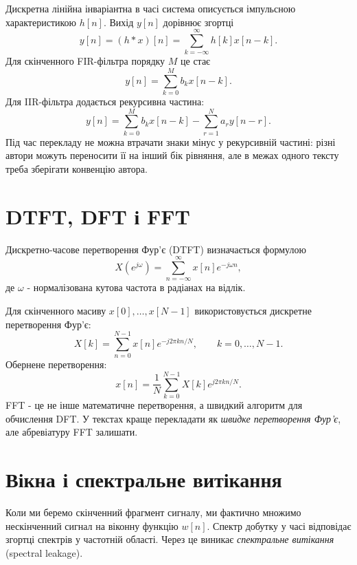 Дискретна лінійна інваріантна в часі система описується імпульсною характеристикою $h[n]$. Вихід $y[n]$ дорівнює згортці
\begin{equation}
    y[n] = (h*x)[n] = \sum_{k=-\infty}^{\infty} h[k]x[n-k].
\end{equation}
Для скінченного FIR-фільтра порядку $M$ це стає
\begin{equation}
    y[n] = \sum_{k=0}^{M} b_k x[n-k].
\end{equation}
Для IIR-фільтра додається рекурсивна частина:
\begin{equation}
    y[n] = \sum_{k=0}^{M} b_k x[n-k] - \sum_{r=1}^{N} a_r y[n-r].
\end{equation}
Під час перекладу не можна втрачати знаки мінус у рекурсивній частині: різні автори можуть переносити її на інший бік рівняння, але в межах одного тексту треба зберігати конвенцію автора.

\section{DTFT, DFT і FFT}

Дискретно-часове перетворення Фур'є (DTFT) визначається формулою
\begin{equation}
    X(e^{j\omega}) = \sum_{n=-\infty}^{\infty} x[n]e^{-j\omega n},
\end{equation}
де $\omega$ - нормалізована кутова частота в радіанах на відлік.

Для скінченного масиву $x[0],\dots,x[N-1]$ використовується дискретне перетворення Фур'є:
\begin{equation}
    X[k] = \sum_{n=0}^{N-1} x[n]e^{-j2\pi kn/N}, \qquad k=0,\dots,N-1.
\end{equation}
Обернене перетворення:
\begin{equation}
    x[n] = \frac{1}{N}\sum_{k=0}^{N-1} X[k]e^{j2\pi kn/N}.
\end{equation}
FFT - це не інше математичне перетворення, а швидкий алгоритм для обчислення DFT. У текстах краще перекладати як \emph{швидке перетворення Фур'є}, але абревіатуру FFT залишати.

\section{Вікна і спектральне витікання}

Коли ми беремо скінченний фрагмент сигналу, ми фактично множимо нескінченний сигнал на віконну функцію $w[n]$. Спектр добутку у часі відповідає згортці спектрів у частотній області. Через це виникає \emph{спектральне витікання} (spectral leakage).

